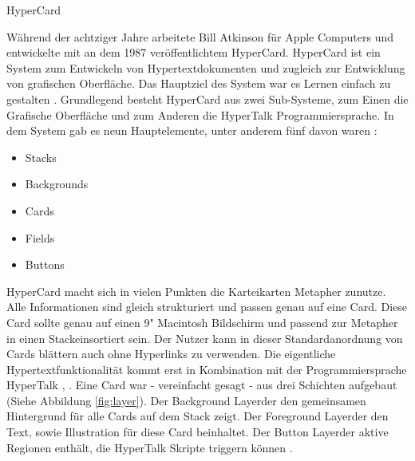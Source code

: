 \begin{section}{HyperCard}
\label{sec:hypercard}

Während der achtziger Jahre arbeitete Bill Atkinson für Apple Computers und entwickelte mit an dem 1987 veröffentlichtem HyperCard. HyperCard ist ein System zum Entwickeln von Hypertextdokumenten und zugleich zur Entwicklung von grafischen Oberfläche. Das Hauptziel des System war es Lernen einfach zu gestalten \cite{Nielsen1991}. Grundlegend besteht HyperCard aus zwei Sub-Systeme, zum Einen die Grafische Oberfläche und zum Anderen die HyperTalk Programmiersprache. In dem System gab es neun \glqq Hauptelemente\grqq, unter anderem fünf davon waren \cite{Goodman1988}:

\begin{itemize}
\item Stacks
\item Backgrounds
\item Cards
\item Fields
\item Buttons
\end{itemize}

HyperCard macht sich in vielen Punkten die Karteikarten Metapher zunutze. Alle Informationen sind gleich strukturiert und passen genau auf eine Card. Diese Card sollte genau auf einen 9" Macintosh Bildschirm und passend zur Metapher in einen \glqq Stack\grqq{ }einsortiert sein. Der Nutzer kann in dieser Standardanordnung von Cards blättern auch ohne Hyperlinks zu verwenden. Die eigentliche Hypertextfunktionalität kommt erst in Kombination mit der Programmiersprache HyperTalk \cite{Goodman1988}, \cite{Nielsen1991}. Eine Card war - vereinfacht gesagt - aus drei Schichten aufgebaut (Siehe Abbildung \ref{fig:layer}). Der \glqq Background Layer\grqq{ }der den gemeinsamen Hintergrund für alle Cards auf dem Stack zeigt. Der \glqq Foreground Layer\grqq{ }der den Text, sowie Illustration für diese Card beinhaltet. Der \glqq Button Layer\grqq{ }der aktive Regionen enthält, die HyperTalk Skripte triggern können \cite{Nielsen1995}.


\end{section}
